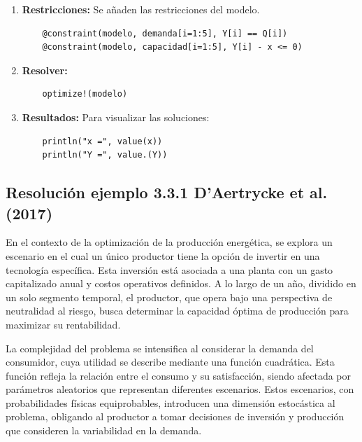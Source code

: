 \begin{enumerate}
    \item \textbf{Restricciones:} Se añaden las restricciones del modelo.

    \begin{footnotesize}
    \begin{lstlisting}
    @constraint(modelo, demanda[i=1:5], Y[i] == Q[i])
    @constraint(modelo, capacidad[i=1:5], Y[i] - x <= 0)
    \end{lstlisting}
    \end{footnotesize}
    
    \item \textbf{Resolver:}

    \begin{footnotesize}
    \begin{lstlisting}
    optimize!(modelo)
    \end{lstlisting}
    \end{footnotesize}
    
    \item \textbf{Resultados:} Para visualizar las soluciones:

    \begin{footnotesize}
    \begin{lstlisting}
    println("x =", value(x))
    println("Y =", value.(Y))
    \end{lstlisting}
    \end{footnotesize}
\end{enumerate}

\subsection{Resolución ejemplo 3.3.1 D'{}Aertrycke et al. (2017)} \label{c273}

En el contexto de la optimización de la producción energética, se explora un escenario en el cual un único productor tiene la opción de invertir en una tecnología específica. Esta inversión está asociada a una planta con un gasto capitalizado anual y costos operativos definidos. A lo largo de un año, dividido en un solo segmento temporal, el productor, que opera bajo una perspectiva de neutralidad al riesgo, busca determinar la capacidad óptima de producción para maximizar su rentabilidad.

\vspace{2.5mm}
La complejidad del problema se intensifica al considerar la demanda del consumidor, cuya utilidad se describe mediante una función cuadrática. Esta función refleja la relación entre el consumo y su satisfacción, siendo afectada por parámetros aleatorios que representan diferentes escenarios. Estos escenarios, con probabilidades físicas equiprobables, introducen una dimensión estocástica al problema, obligando al productor a tomar decisiones de inversión y producción que consideren la variabilidad en la demanda.

